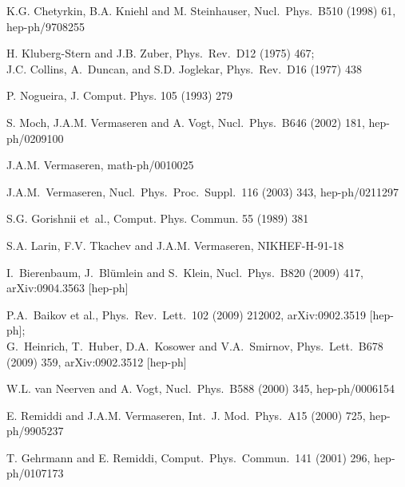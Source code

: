 \documentclass[12pt]{article}
\begin{document}
{\begin{thebibliography}{10}
K.G. Chetyrkin, B.A. Kniehl and M. Steinhauser,
  Nucl.\ Phys.\ B510 (1998) 61, hep-ph/9708255

H. Kluberg-Stern and J.B. Zuber,
  Phys.\ Rev.\ D12 (1975) 467; \\
J.C. Collins, A.~Duncan, and S.D. Joglekar,
  Phys.\ Rev.\ D16 (1977) 438 

P. Nogueira,
  J. Comput. Phys. 105 (1993) 279

S. Moch, J.A.M. Vermaseren and A. Vogt,
  Nucl.\ Phys.\ B646 (2002) 181, hep-ph/0209100

J.A.M. Vermaseren,
  math-ph/0010025

J.A.M.~Vermaseren,
  Nucl.\ Phys.\ Proc.\ Suppl.\ 116 (2003) 343, hep-ph/0211297

S.G. Gorishnii et~al.,
  Comput. Phys. Commun. 55 (1989) 381

S.A. Larin, F.V. Tkachev and J.A.M. Vermaseren,
  NIKHEF-H-91-18

I.~Bierenbaum, J.~Bl\"umlein and S.~Klein,
  Nucl.\ Phys.\  B820 (2009) 417, arXiv:0904.3563 [hep-ph]

P.A.~Baikov et al., 
  Phys.\ Rev.\ Lett.\ 102 (2009) 212002, arXiv:0902.3519 [hep-ph]; \\
G.~Heinrich, T.~Huber, D.A.~Kosower and V.A.~Smirnov,
  Phys.\ Lett.\  B678 (2009) 359, arXiv:0902.3512 [hep-ph]

W.L. van Neerven and A. Vogt,
  Nucl.\ Phys.\ B588 (2000) 345, hep-ph/0006154

E. Remiddi and J.A.M. Vermaseren,
  Int.\ J. Mod.\ Phys.\ A15 (2000) 725, hep-ph/9905237

T. Gehrmann and E. Remiddi,
  Comput.\ Phys.\ Commun.\ 141 (2001) 296, hep-ph/0107173


\end{thebibliography}}
\end{document}
